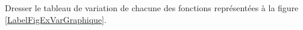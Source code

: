 
\begin{exercice}\label{exoSeconde-0072}


    Dresser le tableau de variation de chacune des fonctions représentées à la figure \ref{LabelFigExVarGraphique}.
\newcommand{\CaptionFigExVarGraphique}{Dresser le tableau de variation des fonctions.}


\end{exercice}
